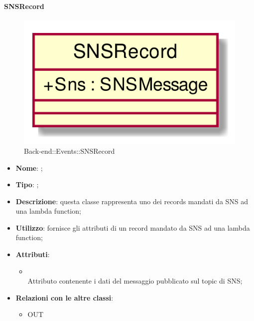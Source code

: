 \hypertarget{SNSRecord_label}{\paragraph{SNSRecord}}
\begin{figure}[h]
	\centering
	\includegraphics[width=\textwidth,height=\textheight,keepaspectratio]{images/ClassSNSRecord.png}
	\caption{Back-end::Events::SNSRecord}
\end{figure}
\begin{itemize}
	\item \textbf{Nome}: ;
	\item \textbf{Tipo}: ;
	\item \textbf{Descrizione}: questa classe rappresenta uno dei records mandati da SNS ad una lambda function;
	\item \textbf{Utilizzo}: fornisce gli attributi di un record mandato da SNS ad una lambda function;
	\item \textbf{Attributi}:
	\begin{itemize}
		\item[]  \\
		Attributo contenente i dati del messaggio pubblicato sul topic di SNS;
	\end{itemize}
	\item \textbf{Relazioni con le altre classi}:
	\begin{itemize}
		\item OUT \hyperlink{SNSMessage_label}{}
	\end{itemize}
\end{itemize}
\FloatBarrier

